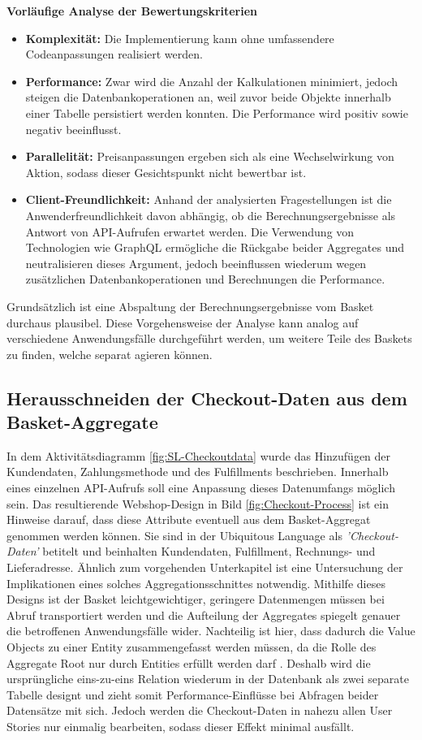 \textbf{Vorläufige Analyse der Bewertungskriterien}

\begin{itemize}[topsep=-2pt]
	\item \textbf{Komplexität: } { Die Implementierung kann ohne umfassendere Codeanpassungen realisiert werden. }
	\item \textbf{Performance: } { Zwar wird die Anzahl der Kalkulationen minimiert, jedoch steigen die Datenbankoperationen an, weil zuvor beide Objekte innerhalb einer Tabelle persistiert werden konnten. Die Performance wird positiv sowie negativ beeinflusst. }
	\item \textbf{Parallelität: } { Preisanpassungen ergeben sich als eine Wechselwirkung von Aktion, sodass dieser Gesichtspunkt nicht bewertbar ist. }
	\item \textbf{Client-Freundlichkeit: } { Anhand der analysierten Fragestellungen ist die Anwenderfreundlichkeit davon abhängig, ob die Berechnungsergebnisse als Antwort von API-Aufrufen erwartet werden. Die Verwendung von Technologien wie GraphQL ermögliche die Rückgabe beider Aggregates und neutralisieren dieses Argument, jedoch beeinflussen wiederum wegen zusätzlichen Datenbankoperationen und Berechnungen die Performance. }
\end{itemize}

Grundsätzlich ist eine Abspaltung der Berechnungsergebnisse vom Basket durchaus plausibel. Diese Vorgehensweise der Analyse kann analog auf verschiedene Anwendungsfälle durchgeführt werden, um weitere Teile des Baskets zu finden, welche separat agieren können. 

\subsection{Herausschneiden der Checkout-Daten aus dem Basket-Aggregate}

In dem Aktivitätsdiagramm \ref{fig:SL-Checkoutdata} wurde das Hinzufügen der Kundendaten, Zahlungsmethode und des Fulfillments beschrieben. Innerhalb eines einzelnen API-Aufrufs soll eine Anpassung dieses Datenumfangs möglich sein. Das resultierende Webshop-Design in Bild \ref{fig:Checkout-Process} ist ein Hinweise darauf, dass diese Attribute eventuell aus dem Basket-Aggregat genommen werden können. Sie sind in der Ubiquitous Language als \emph{'Checkout-Daten'} betitelt und beinhalten Kundendaten, Fulfillment, Rechnungs- und Lieferadresse. Ähnlich zum vorgehenden Unterkapitel ist eine Untersuchung der Implikationen eines solches Aggregationsschnittes notwendig. Mithilfe dieses Designs ist der Basket leichtgewichtiger, geringere Datenmengen müssen bei Abruf transportiert werden und die Aufteilung der Aggregates spiegelt genauer die betroffenen Anwendungsfälle wider. Nachteilig ist hier, dass dadurch die Value Objects zu einer Entity zusammengefasst werden müssen, da die Rolle des Aggregate Root nur durch Entities erfüllt werden darf \cite[S. 129]{Evans.2011}. Deshalb wird die ursprüngliche eins-zu-eins Relation wiederum in der Datenbank als zwei separate Tabelle designt und zieht somit Performance-Einflüsse bei Abfragen beider Datensätze mit sich. Jedoch werden die Checkout-Daten in nahezu allen User Stories nur einmalig bearbeiten, sodass dieser Effekt minimal ausfällt. 

